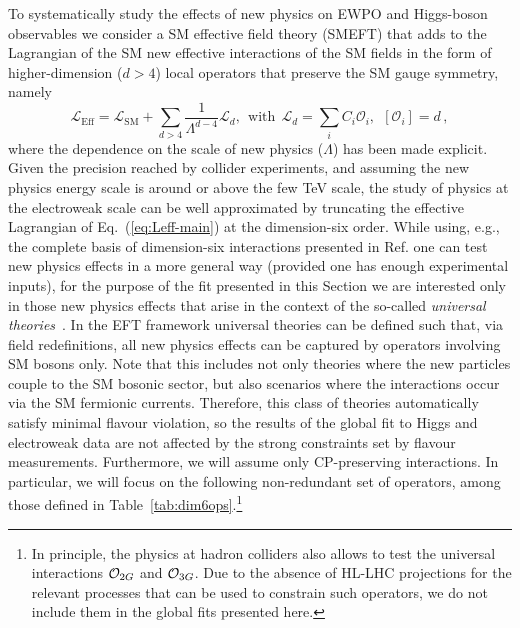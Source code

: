 To systematically study the effects of new physics on EWPO and
Higgs-boson observables we consider a SM effective field theory
(SMEFT) that adds to the Lagrangian of the SM new effective
interactions of the SM fields in the form of higher-dimension ($d>4$)
local operators that preserve the SM gauge symmetry, namely
%
\begin{equation}
\label{eq:Leff-main}
{\mathcal L}_{\mathrm{Eff}}={\mathcal L}_{\mathrm{SM}}+\sum_{d>4}\frac{1}{\Lambda^{d-4}}{\mathcal L}_d,
~~\mbox{with}~~{\mathcal L}_d=\sum_i C_i {\mathcal O}_i,~~\left[{\mathcal O}_i\right]=d\,,
\end{equation}
%
where the dependence on the scale of new physics ($\Lambda$) has been
made explicit.  Given the precision reached by collider experiments,
and assuming the new physics energy scale is around or above the few
TeV scale, the study of physics at the electroweak scale can be well
approximated by truncating the effective Lagrangian of
Eq.~(\ref{eq:Leff-main}) at the dimension-six order. 
While using, e.g., the
complete basis of dimension-six interactions presented in
Ref. \cite{Grzadkowski:2010es} one can test new physics effects in 
a more general way (provided one has enough experimental inputs),
for the purpose of the fit presented in this Section we are interested only in those
new physics effects that arise in the context of the so-called {\it universal theories}~\cite{Barbieri:2004qk,Wells:2015uba}.
In the EFT framework universal theories can be defined such that, via field redefinitions, all new physics effects
can be captured by operators involving SM bosons only. Note that this includes not only theories where the
new particles couple to the SM bosonic sector, but also scenarios where the interactions 
occur via the SM fermionic currents. Therefore, this class of theories automatically 
satisfy minimal flavour violation, so the results of the global fit to Higgs and electroweak data 
are not affected by the strong constraints set by flavour measurements. Furthermore,
we will assume only CP-preserving interactions. 
In particular, we will focus on the following non-redundant set of operators, among those defined in Table~\ref{tab:dim6ops}.\footnote{In principle, the physics at hadron colliders also allows to test the universal interactions ${\cal O}_{2G}$ and ${\cal O}_{3G}$. Due to the absence of HL-LHC projections for the relevant processes that can be used to constrain such operators, we do not include them in the global fits presented here.} 
%
